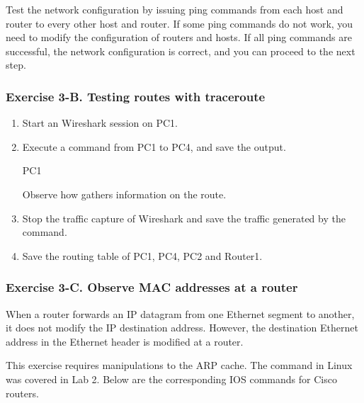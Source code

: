 Test the network configuration by issuing ping commands from each host and router to every other host and router. If some ping commands do not work, you need to modify the configuration of routers and hosts. If all ping commands are successful, the network configuration is correct, and you can proceed to the next step.

\subsubsection*{Exercise 3-B. Testing routes with traceroute}

\begin{enumerate}
	\item Start an Wireshark session on PC1.
	\item Execute a  command from PC1 to PC4, and save the output.
		\begin{cmdblock}
	PC1%
		\end{cmdblock}
		Observe how  gathers information on the route.
	\item Stop the traffic capture of Wireshark and save the traffic generated by the  command.
	\item Save the routing table of PC1, PC4, PC2 and Router1.
\end{enumerate}

\begin{questions}
\end{questions}
	
\subsubsection*{Exercise 3-C. Observe MAC addresses at a router}

When a router forwards an IP datagram from one Ethernet segment to another, it does not modify the IP destination address. However, the destination Ethernet address in the Ethernet header is modified at a router.

This exercise requires manipulations to the ARP cache. The  command in Linux was covered in Lab 2. Below are the corresponding IOS commands for Cisco routers.


